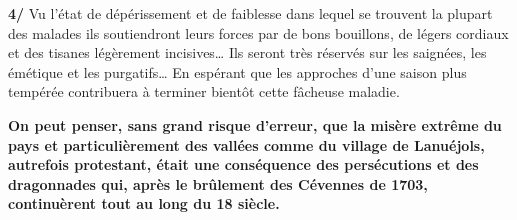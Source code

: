 {\textbf{4/} Vu l’état de dépérissement et de faiblesse dans lequel se trouvent la plupart des malades ils soutiendront leurs forces par de bons bouillons, de légers cordiaux et des tisanes légèrement incisives… Ils seront très réservés sur les saignées, les émétique et les purgatifs… En espérant que les approches d’une saison plus tempérée contribuera à terminer bientôt cette fâcheuse maladie.

\vspace{0mm}

\begin{tcolorbox}[
  colback=white,
  colframe=black,
  boxrule=0.7pt,
  arc=0pt,
  left=6pt,right=6pt,top=5pt,bottom=5pt
]
\textbf{On peut penser, sans grand risque d’erreur, que la misère extrême du pays et particulièrement des vallées comme du village de Lanuéjols, autrefois protestant, était une conséquence des persécutions et des dragonnades qui, après le brûlement des Cévennes de 1703, continuèrent tout au long du 18\ieme{} siècle.}
\end{tcolorbox}

}


